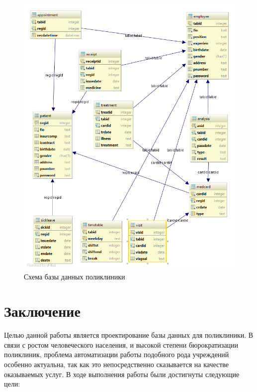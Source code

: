 \documentclass[14pt,a4paper,russian]{extreport}
\begin{document}
\begin{figure}[t!]
        \includegraphics[width=\textwidth]{clinic}
        \caption{Схема базы данных поликлиники}
        \label{fig:clinic}
\end{figure}
\vfill
\phantom{0}


\chapter*{Заключение}
Целью данной работы является проектирование базы данных для поликлиники. 
В связи с ростом человеческого населения, и высокой степени бюрократизации поликлиник, проблема
автоматизации работы подобного рода учреждений особенно актуальна, так как это непосредственно
сказывается на качестве оказываемых услуг. В ходе выполнения работы были достигнуты следующие цели: 
\end{document}
